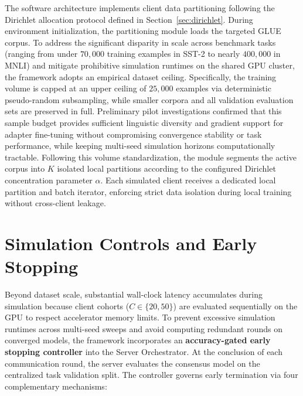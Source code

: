 The software architecture implements client data partitioning following the Dirichlet allocation protocol defined in Section~\ref{sec:dirichlet}. During environment initialization, the partitioning module loads the targeted GLUE corpus. To address the significant disparity in scale across benchmark tasks (ranging from under $70{,}000$ training examples in SST-2 to nearly $400{,}000$ in MNLI) and mitigate prohibitive simulation runtimes on the shared GPU cluster, the framework adopts an empirical dataset ceiling. Specifically, the training volume is capped at an upper ceiling of $25{,}000$ examples via deterministic pseudo-random subsampling, while smaller corpora and all validation evaluation sets are preserved in full. Preliminary pilot investigations confirmed that this sample budget provides sufficient linguistic diversity and gradient support for adapter fine-tuning without compromising convergence stability or task performance, while keeping multi-seed simulation horizons computationally tractable. Following this volume standardization, the module segments the active corpus into $K$ isolated local partitions according to the configured Dirichlet concentration parameter $\alpha$. Each simulated client receives a dedicated local partition and batch iterator, enforcing strict data isolation during local training without cross-client leakage.

\section{Simulation Controls and Early Stopping}
\label{sec:impl_early_stopping}

Beyond dataset scale, substantial wall-clock latency accumulates during simulation because client cohorts ($C \in \{20, 50\}$) are evaluated sequentially on the GPU to respect accelerator memory limits. To prevent excessive simulation runtimes across multi-seed sweeps and avoid computing redundant rounds on converged models, the framework incorporates an \textbf{accuracy-gated early stopping controller} into the Server Orchestrator. At the conclusion of each communication round, the server evaluates the consensus model on the centralized task validation split. The controller governs early termination via four complementary mechanisms:

